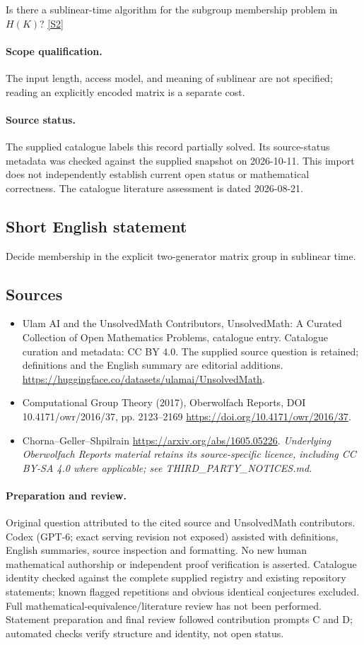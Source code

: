 \documentclass[11pt]{article}
\begin{document}
Is there a sublinear-time algorithm for the subgroup membership problem in $H(K)$? \href{https://doi.org/10.4171/owr/2016/37}{[S2]}
\paragraph{Scope qualification.}
The input length, access model, and meaning of sublinear are not specified; reading an explicitly encoded matrix is a separate cost.
\paragraph{Source status.}
The supplied catalogue labels this record partially solved. Its source-status metadata was checked against the supplied snapshot on 2026-10-11. This import does not independently establish current open status or mathematical correctness. The catalogue literature assessment is dated 2026-08-21.
\subsection{Short English statement}
Decide membership in the explicit two-generator matrix group in sublinear time.
\subsection{Sources}
\begin{itemize}
\item[S1] Ulam AI and the UnsolvedMath Contributors, UnsolvedMath: A Curated Collection of Open Mathematics Problems, catalogue entry. Catalogue curation and metadata: CC BY 4.0. The supplied source question is retained; definitions and the English summary are editorial additions.
\url{https://huggingface.co/datasets/ulamai/UnsolvedMath}.
\item[S2] Computational Group Theory (2017), Oberwolfach Reports, DOI 10.4171/owr/2016/37, pp. 2123--2169
\url{https://doi.org/10.4171/owr/2016/37}.
\item[S3] Chorna--Geller--Shpilrain
\url{https://arxiv.org/abs/1605.05226}.
\textit{Underlying Oberwolfach Reports material retains its source-specific licence, including CC BY-SA 4.0 where applicable; see THIRD\_PARTY\_NOTICES.md.}
\end{itemize}
\paragraph{Preparation and review.}
Original question attributed to the cited source and UnsolvedMath contributors. Codex (GPT-6; exact serving revision not exposed) assisted with definitions, English summaries, source inspection and formatting. No new human mathematical authorship or independent proof verification is asserted. Catalogue identity checked against the complete supplied registry and existing repository statements; known flagged repetitions and obvious identical conjectures excluded. Full mathematical-equivalence/literature review has not been performed. Statement preparation and final review followed contribution prompts C and D; automated checks verify structure and identity, not open status.
\label{end:statement}
\end{document}
